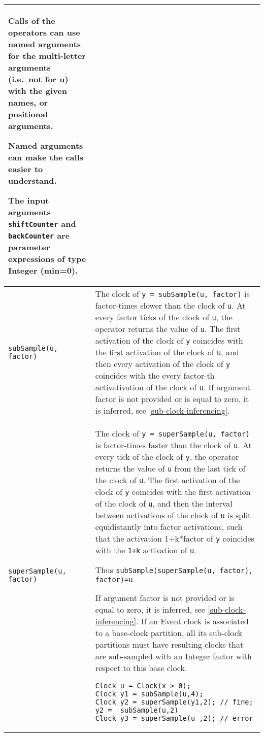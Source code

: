 \begin{longtable}[]{|p{4cm}|p{11cm}|}
{Calls of the operators can use named arguments for the multi-letter arguments (i.e.\ not for u) with the given names, or positional arguments.
\begin{nonnormative}
Named arguments can make the calls easier to understand.
\end{nonnormative}
The input arguments \lstinline!shiftCounter! and \lstinline!backCounter! are parameter
expressions of type Integer (min=0).}
\\ \hline
\lstinline!subSample(u, factor)!
&
The clock of \lstinline!y = subSample(u, factor)! is factor-times slower than the clock of \lstinline!u!. At every factor ticks of the clock of \lstinline!u!, the
operator returns the value of \lstinline!u!. The first activation of the clock of \lstinline!y!
coincides with the first activation of the clock of \lstinline!u!, and then every activation of the clock of \lstinline!y!
coincides with the every factor-th activativation of the clock of \lstinline!u!. If argument
factor is not provided or is equal to zero, it is inferred, see \cref{sub-clock-inferencing}.
\\ \hline
\lstinline!superSample(u, factor)!
&
The clock of \lstinline!y = superSample(u, factor)! is factor-times faster
than the clock of \lstinline!u!. At every tick of the clock of \lstinline!y!, the operator
returns the value of \lstinline!u! from the last tick of the clock of \lstinline!u!. The first
activation of the clock of \lstinline!y! coincides with the first activation of the
clock of \lstinline!u!, and then the interval between activations of the clock of \lstinline!u! is split equidistantly
into factor activations, such that the activation 1+k*factor of \lstinline!y! coincides with the \lstinline!1+k! activation of \lstinline!u!.
\begin{nonnormative}
Thus \lstinline!subSample(superSample(u, factor), factor)=u!
\end{nonnormative}
If argument factor is not provided or is equal to zero, it
is inferred, see \cref{sub-clock-inferencing}. If an Event clock is associated to a
base-clock partition, all its sub-clock partitions must have resulting
clocks that are sub-sampled with an Integer factor with respect to this
base clock.
\par
\begin{example*}
\begin{lstlisting}[language=modelica]
Clock u = Clock(x > 0);
Clock y1 = subSample(u,4);
Clock y2 = superSample(y1,2); // fine; y2 =  subSample(u,2)
Clock y3 = superSample(u ,2); // error

\end{lstlisting}
\end{example*}
\end{longtable}
